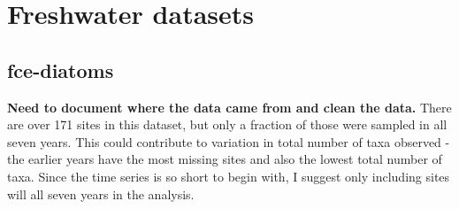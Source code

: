\documentclass[11pt, oneside]{article}
\begin{document}


\section {Freshwater datasets}

\subsection {fce-diatoms}
{\bf Need to document where the data came from and clean the data.}
There are over 171 sites in this dataset, but only a fraction of those were sampled in all seven years.
This could  contribute to variation in total number of taxa observed - the earlier years have the most missing sites and also the lowest total number of taxa.
Since the time series is so short to begin with, I suggest only including sites will all seven years in the analysis.
\end{document}
